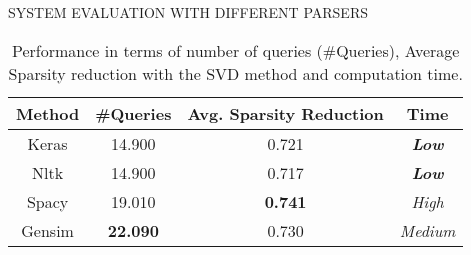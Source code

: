 \begin{frame}{SYSTEM EVALUATION WITH DIFFERENT PARSERS}
\begin{table}[h!]
        \label{Index}
    \end{table}
    \begin{table}[h!]
        \centering
        \begin{adjustbox}{max width=6cm}
        \begin{tabular}{|c|c|c|c|}
            \hline
            \bfseries{Method} & \bfseries{\#Queries} &\bfseries{Avg. Sparsity Reduction} &\bfseries{Time}\\
            \hline
            \hline
            Keras & 14.900 & 0.721 &\bfseries{\emph{Low}}\\
            \hline
            Nltk & 14.900 & 0.717 &\bfseries{\emph{Low}}\\
            \hline
            Spacy & 19.010 & \bfseries{0.741} &\emph{High}\\
            \hline
            Gensim & \bfseries{22.090} & 0.730 &\emph{Medium}\\
            \hline
        \end{tabular}
        \end{adjustbox}
        \caption{Performance in terms of number of queries (\#Queries), Average Sparsity reduction with the SVD method and computation time.}
        \label{performance}
    \end{table}
\end{frame}

